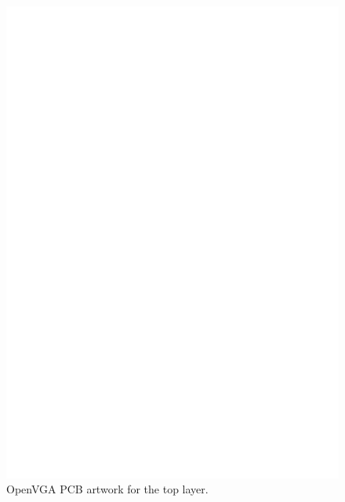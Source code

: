 \begin{figure}
\begin{center}
\includegraphics[width=\linewidth]{images/freega3_pcb_art_top.eps}
\caption[OpenVGA PCB Artwork Top Layer]{OpenVGA PCB artwork for the top layer.}
\end{center}
\end{figure}

